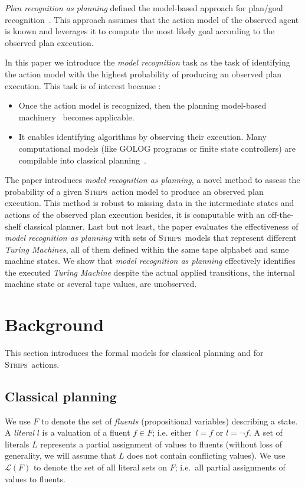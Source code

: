 \documentclass[letterpaper]{article} %
\newcommand{\strips}{\textsc{Strips}}     %
\begin{document}
{\em Plan recognition as planning} defined the model-based approach for plan/goal recognition~\cite{ramirez2012plan,ramirez2009plan}. This approach assumes that the action model of the observed agent is known and leverages it to compute the most likely goal according to the observed plan execution.

In this paper we introduce the {\em model recognition} task as the task of identifying the action model with the highest probability of producing an observed plan execution. This task is of interest because :
\begin{itemize}
\item Once the action model is recognized, then the planning model-based machinery~\cite{ghallab2004automated,geffner:book:2013} becomes applicable.
\item It enables identifying algorithms by observing their execution. Many computational models (like {\sc GOLOG} programs or finite state controllers) are compilable into classical planning~\cite{baier2007exploiting,Geffner:FSM:AAAI10,segovia2016hierarchical}.    
\end{itemize}

The paper introduces {\em model recognition as planning}, a novel method to assess the probability of a given \strips\ action model to produce an observed plan execution. This method is robust to missing data in the intermediate states and actions of the observed plan execution besides, it is computable with an off-the-shelf classical planner. Last but not least, the paper evaluates the effectiveness of {\em model recognition as planning} with sets of \strips\ models that represent different {\em Turing Machines}, all of them defined within the same tape alphabet and same machine states. We show that {\em model recognition as planning} effectively identifies the executed {\em Turing Machine} despite the actual applied transitions, the internal machine state or several tape values, are unobserved.


\section{Background}
\label{sec:background}
This section introduces the formal models for classical planning and for \strips\ actions.

\subsection{Classical planning}
We use $F$ to denote the set of {\em fluents} (propositional variables) describing a state. A {\em literal} $l$ is a valuation of a fluent $f\in F$; i.e. either~$l=f$ or $l=\neg f$. A set of literals $L$ represents a partial assignment of values to fluents (without loss of generality, we will assume that $L$ does not contain conflicting values). We use $\mathcal{L}(F)$ to denote the set of all literal sets on $F$; i.e.~all partial assignments of values to fluents.
\end{document}
